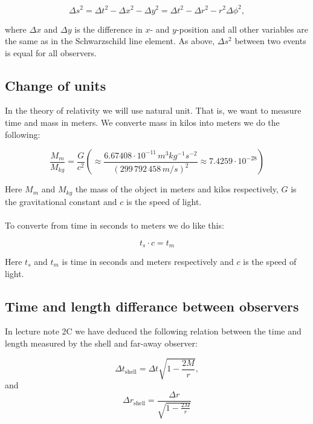 \documentclass[a4paper,10pt,english]{article}
\begin{document}
\begin{equation}\label{eq:lorentz}
\Delta s^{2}=\Delta t^{2}-\Delta x^{2}-\Delta y^{2}=\Delta t^{2}-\Delta r^{2}-r^{2}\Delta\phi^{2},
\end{equation}

where $\Delta x$ and $\Delta y$ is the difference in $x$- and $y$-position and all other variables are the same as in the Schwarzschild line element. As above, $\Delta s^{2}$ between two events is equal for all observers.


\subsection*{Change of units}

In the theory of relativity we will use natural unit. That is, we want to measure time and mass in meters. We converte mass in kilos into meters we do the following:

\begin{equation}\label{eq:kg_to_m}
\frac{M_{m}}{M_{kg}}=\frac{G}{c^{2}}\left(\approx\frac{6.67408\cdot10^{-11}\,m^{3}kg^{-1}s^{-2}}{(299\,792\,458\,m/s)^{2}}\approx7.4259\cdot10^{-28}\right)
\end{equation}

Here $M_{m}$ and $M_{kg}$ the mass of the object in meters and kilos respectively, $G$ is the gravitational constant and $c$ is the speed of light.
\\
\\
To converte from time in seconds to meters we do like this:
 
\begin{equation}\label{eq:s_to_m}
t_{s}\cdot c=t_{m}
\end{equation}

Here $t_{s}$ and $t_{m}$ is time in seconds and meters respectively and $c$ is the speed of light.


\subsection*{Time and length differance between observers}

In lecture note 2C we have deduced the following relation between the time and length measured by the shell and far-away observer:

\begin{equation}\label{eq:shell_time}
\Delta t_{\text{shell}}=\Delta t\sqrt{1-\frac{2M}{r}},
\end{equation}
and
\begin{equation}\label{eq:shell_length}
\Delta r_{\text{shell}}=\frac{\Delta r}{\sqrt{1-\frac{2M}{r}}}
\end{equation}
\end{document}
